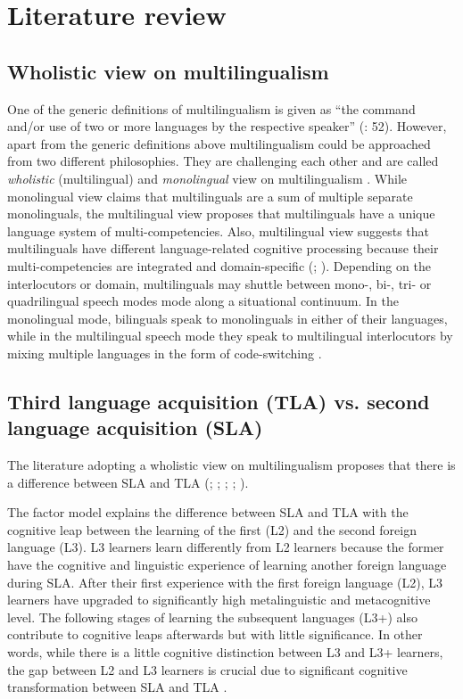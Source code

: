 \documentclass[output=paper]{../langscibook}
\begin{document}
\section{Literature review}


\subsection{Wholistic view on multilingualism}



One of the generic definitions of multilingualism is given as “the command and\slash or use of two or more languages by the respective speaker” (\citealt{HerdinaJessner2002}: 52). However, apart from the generic definitions above multilingualism could be approached from two different philosophies. They are challenging each other and are called \emph{wholistic} (multilingual) and \emph{monolingual} view on multilingualism \citep{Grosjean2008}. While monolingual view claims that multilinguals are a sum of multiple separate monolinguals, the multilingual view proposes that multilinguals have a unique language system of multi-competencies. Also, multilingual view suggests that multilinguals have different language-related cognitive processing because their multi-competencies are integrated and domain-specific (\citealt{Cook1993}; \citealt{Grosjean2008}). Depending on the interlocutors or domain, multilinguals may shuttle between mono-, bi-, tri- or quadrilingual speech modes mode along a situational continuum. In the monolingual mode, bilinguals speak to monolinguals in either of their languages, while in the multilingual speech mode they speak to multilingual interlocutors by mixing multiple languages in the form of code-switching \citep{Grosjean2008}.



\subsection{Third language acquisition (TLA) vs. second language acquisition (SLA)}



The literature adopting a wholistic view on multilingualism proposes that there is a difference between SLA and TLA (\citealt{Jessner1999}; \citealt{HerdinaJessner2002}; \citealt{Hufeisen2004}; \citealt{MarxHufeisen2004}; \citealt{Cenoz2013a,Cenoz2013b}).

The factor model \citep{Hufeisen2004} explains the difference between SLA and TLA with the cognitive leap between the learning of the first (L2) and the second foreign language (L3). L3 learners learn differently from L2 learners because the former have the cognitive and linguistic experience of learning another foreign language during SLA. After their first experience with the first foreign language (L2), L3 learners have upgraded to significantly high metalinguistic and metacognitive level. The following stages of learning the subsequent languages (L3+) also contribute to cognitive leaps afterwards but with little significance.  In other words, while there is a little cognitive distinction between L3 and L3+ learners, the gap between L2 and L3 learners is crucial due to significant cognitive transformation between SLA and TLA \citep{Hufeisen2004}.
\end{document}
